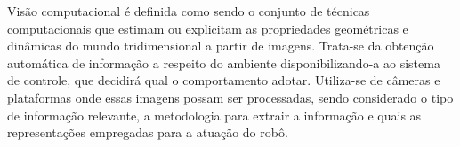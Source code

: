 Visão computacional é definida como sendo o conjunto de técnicas computacionais que estimam ou explicitam as propriedades geométricas e dinâmicas do mundo tridimensional a partir de imagens. Trata-se da obtenção automática de informação a respeito do ambiente disponibilizando-a ao sistema de controle, que decidirá qual o comportamento adotar. Utiliza-se de câmeras e plataformas onde essas imagens possam ser processadas, sendo considerado o tipo de informação relevante, a metodologia para extrair a informação e quais as representações empregadas para a atuação do robô.









